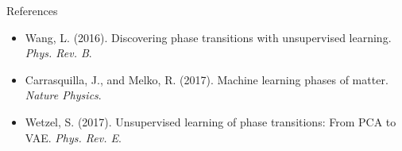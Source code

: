 \documentclass{beamer}
\begin{document}
\begin{frame}{References}
\footnotesize
\begin{itemize}
    \item Wang, L. (2016). Discovering phase transitions with unsupervised learning. \textit{Phys. Rev. B}.
    \item Carrasquilla, J., and Melko, R. (2017). Machine learning phases of matter. \textit{Nature Physics}.
    \item Wetzel, S. (2017). Unsupervised learning of phase transitions: From PCA to VAE. \textit{Phys. Rev. E}.
\end{itemize}
\end{frame}
\end{document}
